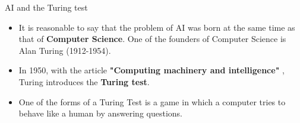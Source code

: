 \documentclass[usenames,dvipsnames]{beamer}
\begin{document}
%
%
%
%

\begin{frame}{AI and the Turing test}
    \begin{itemize}
	\item It is reasonable to say that the problem of AI was born at the same
        time as that of \textbf{{Computer Science}}. One of the founders of
            Computer Science is Alan Turing (1912-1954). 
        \item In 1950, with the article \textbf{{"Computing machinery and intelligence"}} \cite{Turing2009}, Turing introduces the \textbf{{Turing test}}. 
	\item One of the forms of a Turing Test is a game in which a computer tries to behave like a human by answering questions.
    \end{itemize}
\end{frame}
\end{document}

